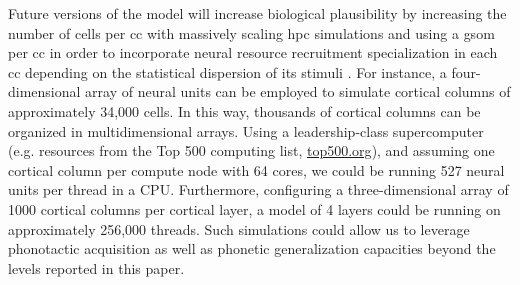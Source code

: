 {Future versions of the model will increase biological plausibility by increasing the number of cells per \gls{cc} with massively scaling \gls{hpc} simulations and using a \gls{gsom} per \gls{cc} in order to incorporate neural resource recruitment specialization in each \gls{cc} depending on the statistical dispersion of its stimuli \cite{Meyer19113}. For instance, a four-dimensional array of neural units can be employed to simulate cortical columns of approximately 34,000 cells. In this way, thousands of cortical columns can be organized in multidimensional arrays. Using a leadership-class supercomputer (e.g. resources from the Top 500 computing list, \url{top500.org}), and assuming one cortical column per compute node with 64 cores, we could be running 527 neural units per thread in a CPU. Furthermore, configuring a three-dimensional array of 1000 cortical columns per cortical layer, a model of 4 layers could be running on approximately 256,000 threads. Such simulations could allow us to leverage phonotactic acquisition as well as phonetic generalization capacities beyond the levels reported in this paper.
}



























